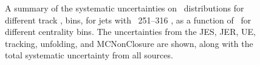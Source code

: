 \begin{figure}
{\begin{tabular}{cc}
\end{tabular} }
   \caption{A summary of the systematic uncertainties on \RDptr\ distributions for different track \pt, bins, for jets with \pt\ 251--316  \GeV, as a function of \rvar\ for different centrality bins. The uncertainties from the JES, JER, UE, tracking, unfolding, and MCNonClosure are shown, along with the total systematic uncertainty from all sources. }
      \label{fig:rdptr_sys_uncert_A3}
\end{figure}
